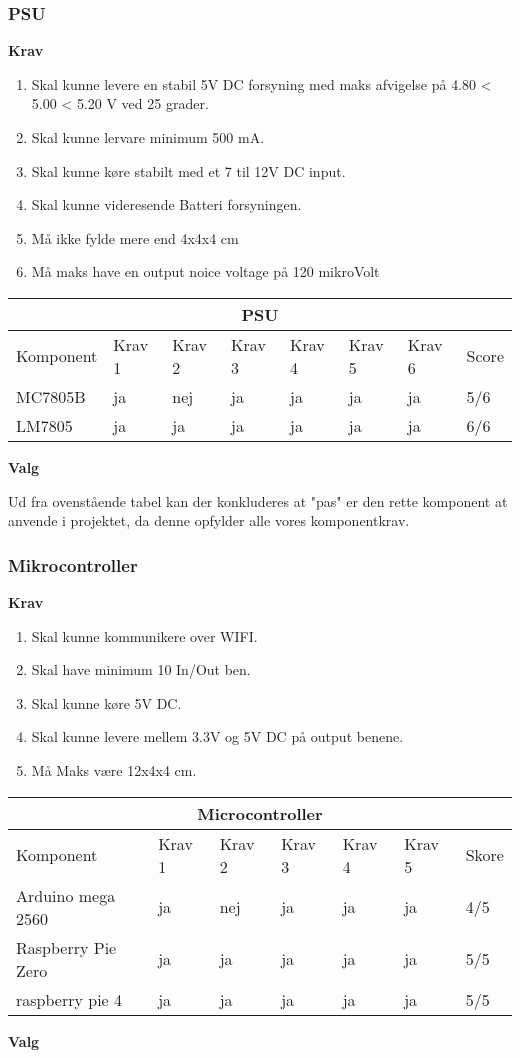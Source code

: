 \subsubsection{PSU}
\textbf{Krav}
\begin{enumerate}
\item Skal kunne levere en stabil 5V DC forsyning  med maks afvigelse på  4.80 < 5.00 < 5.20 V ved 25 grader.
\item Skal kunne lervare minimum 500 mA.
\item Skal kunne køre stabilt med et 7 til 12V DC input.
\item Skal kunne videresende Batteri forsyningen.
\item Må ikke fylde mere end 4x4x4 cm
\item Må maks have en output noice voltage på 120 mikroVolt
\end{enumerate}
\begin{center}
\begin{tabular}{|p{2.5cm}||p{1.3cm}|p{1.3cm}|p{1.3cm}|p{1.3cm}| p{1.3cm}| p{1.3cm}| p{1cm}|}
 \hline
 \multicolumn{8}{|c|}{PSU} \\
 \hline
 Komponent & Krav 1 & Krav 2 & Krav 3 & Krav 4 & Krav 5 & Krav 6 & Score \\
 \hline
 MC7805B & ja & nej & ja & ja & ja & ja & 5/6\\
 LM7805 & ja & ja & ja & ja & ja & ja & 6/6\\
 \hline
\end{tabular}
\end{center}
\textbf{Valg}

Ud fra ovenstående tabel kan der konkluderes at "pas" er den rette komponent at anvende i projektet, da denne opfylder alle vores komponentkrav.  


\subsubsection{Mikrocontroller}
\textbf{Krav}
\begin{enumerate}
\item Skal kunne kommunikere  over WIFI.
\item Skal have minimum 10 In/Out ben.
\item Skal kunne køre 5V DC.
\item Skal kunne levere mellem 3.3V og 5V DC på output benene.
\item Må Maks være 12x4x4 cm.
\end{enumerate}
\begin{center}
\begin{tabular}{|p{3.5cm}||p{1.3cm}|p{1.3cm}|p{1.3cm}| p{1.3cm}| p{1.3cm}| p{1cm}|}
 \hline
 \multicolumn{7}{|c|}{Microcontroller} \\
 \hline
 Komponent & Krav 1 & Krav 2 & Krav 3 & Krav 4 & Krav 5 & Skore \\
 \hline
 Arduino mega 2560 & ja & nej & ja & ja & ja & 4/5\\
 Raspberry Pie Zero & ja & ja & ja & ja & ja & 5/5\\
 raspberry pie 4 & ja & ja & ja & ja & ja & 5/5\\
 \hline
\end{tabular}
\end{center}
\textbf{Valg}

